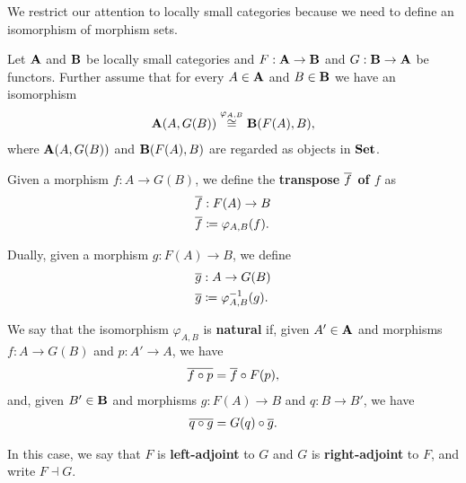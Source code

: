\begin{note}
  We restrict our attention to locally small categories because we need to define an isomorphism of morphism sets.
\end{note}
\begin{definition}\label{def:adjoint_functor}\cite[definition 2.1.1]{Leinster2014}
  Let \( \operatorname{\mathbf{A}} \) and \( \operatorname{\mathbf{B}} \) be locally small categories and \( F: \operatorname{\mathbf{A}} \to \operatorname{\mathbf{B}} \) and \( G: \operatorname{\mathbf{B}} \to \operatorname{\mathbf{A}} \) be functors. Further assume that for every \( A \in \operatorname{\mathbf{A}} \) and \( B \in \operatorname{\mathbf{B}} \) we have an isomorphism
  \begin{align*}
    \operatorname{\mathbf{A}}(A, G(B)) \overset {\varphi_{A, B}} {\cong} \operatorname{\mathbf{B}}(F(A), B),
  \end{align*}
  where \( \operatorname{\mathbf{A}}(A, G(B)) \) and \( \operatorname{\mathbf{B}}(F(A), B) \) are regarded as objects in \( \operatorname{\mathbf{Set}} \).

  Given a morphism \( f: A \to G(B) \), we define the \textbf{transpose \( \overline{f} \) of \( f \)} as
  \begin{align*}
    &\overline{f}: F(A) \to B \\
    &\overline{f} \coloneqq \varphi_{A, B} (f).
  \end{align*}

  Dually, given a morphism \( g: F(A) \to B \), we define
  \begin{align*}
    &\overline{g}: A \to G(B) \\
    &\overline{g} \coloneqq \varphi_{A, B}^{-1} (g).
  \end{align*}

  We say that the isomorphism \( \varphi_{A, B} \) is \textbf{natural} if,  given \( A' \in \operatorname{\mathbf{A}} \) and morphisms \( f: A \to G(B) \) and \( p: A' \to A \), we have
  \begin{align*}
    \overline{f \circ p} = \overline{f} \circ F(p),
  \end{align*}
  and, given \( B' \in \operatorname{\mathbf{B}} \) and morphisms \( g: F(A) \to B \) and \( q: B \to B' \), we have
  \begin{align*}
    \overline{q \circ g} = G(q) \circ \overline{g}.
  \end{align*}

  In this case, we say that \( F \) is \textbf{left-adjoint} to \( G \) and \( G \) is \textbf{right-adjoint} to \( F \), and write \( F \dashv G \).
\end{definition}

